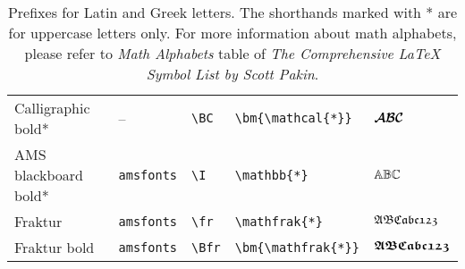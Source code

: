 \documentclass[]{article}
\begin{document}
\begin{table}[htbp]
\begin{tabular}{l l l l l}
    Calligraphic bold* & -- & \verb+\BC+ & \verb+\bm{\mathcal{*}}+ & ${\bm{\mathcal{A}}}{\bm{\mathcal{B}}}{\bm{\mathcal{C}}}$ \\
    AMS blackboard bold* & \texttt{amsfonts} & \verb+\I+ & \verb+\mathbb{*}+ & ${\mathbb{A}}{\mathbb{B}}{\mathbb{C}}$ \\
    Fraktur & \texttt{amsfonts} & \verb+\fr+ & \verb+\mathfrak{*}+ & ${\mathfrak{A}}{\mathfrak{B}}{\mathfrak{C}}{\mathfrak{a}}{\mathfrak{b}}{\mathfrak{c}}{\mathfrak{1}}{\mathfrak{2}}{\mathfrak{3}}$\\
    Fraktur bold & \texttt{amsfonts} & \verb+\Bfr+ & \verb+\bm{\mathfrak{*}}+ & $\bm{{\mathfrak{A}}}\bm{{\mathfrak{B}}}\bm{{\mathfrak{C}}}\bm{{\mathfrak{a}}}\bm{{\mathfrak{b}}}\bm{{\mathfrak{c}}}\bm{{\mathfrak{1}}}\bm{{\mathfrak{2}}}\bm{{\mathfrak{3}}}$\\
    \bottomrule
  \end{tabular}
  \caption{Prefixes for Latin and Greek letters.
    The shorthands marked with * are for uppercase letters only.
    For more information about math
    alphabets, please refer to {\em Math Alphabets} table of
    \emph{The Comprehensive \LaTeX{} Symbol List by Scott Pakin}.
    }
  \label{tb:math}
\end{table}

\end{document}
